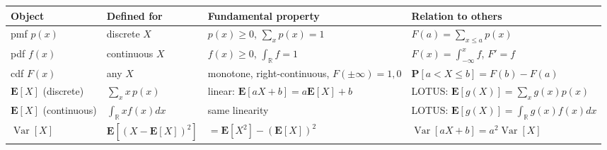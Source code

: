 \documentclass[11pt]{article}
\theoremstyle{definition}
\theoremstyle{plain}
\theoremstyle{remark}
\newcommand{\R}{\mathbb{R}}
\begin{document}
\begin{center}
\renewcommand{\arraystretch}{1.6}
\begin{longtable}{p{3.4cm} p{3.6cm} p{3.6cm} p{4.0cm}}
\toprule
\textbf{Object} & \textbf{Defined for} & \textbf{Fundamental property} & \textbf{Relation to others} \\
\midrule
pmf $p(x)$ & discrete $X$ & $p(x)\ge 0$, $\sum_x p(x)=1$ & $F(a)=\sum_{x\le a}p(x)$ \\
pdf $f(x)$ & continuous $X$ & $f(x)\ge 0$, $\int_\R f=1$ & $F(x)=\int_{-\infty}^x f$, $F'=f$ \\
cdf $F(x)$ & any $X$ & monotone, right-continuous, $F(\pm\infty)=1,0$ & $\mathbf{P}[a<X\le b]=F(b)-F(a)$ \\
$\mathbf{E}[X]$ (discrete) & $\sum_x x\,p(x)$ & linear: $\mathbf{E}[aX+b]=a\mathbf{E}[X]+b$ & LOTUS: $\mathbf{E}[g(X)]=\sum_x g(x)p(x)$ \\
$\mathbf{E}[X]$ (continuous) & $\int_\R x f(x)dx$ & same linearity & LOTUS: $\mathbf{E}[g(X)]=\int_\R g(x)f(x)dx$ \\
$\operatorname{Var}[X]$ & $\mathbf{E}[(X-\mathbf{E}[X])^2]$ & $=\mathbf{E}[X^2]-(\mathbf{E}[X])^2$ & $\operatorname{Var}[aX+b]=a^2\operatorname{Var}[X]$ \\
\bottomrule
\end{longtable}
\end{center}
\end{document}
